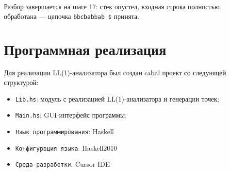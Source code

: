 \documentclass[areasetadvanced]{scrartcl}
\begin{document}
Разбор завершается на шаге 17: стек опустел, входная
строка полностью обработана — цепочка \texttt{bbcbabbab \$} принята.
\newpage
\section{Программная реализация}
Для реализации LL(1)-анализатора был создан cabal проект со следующей структурой:
\begin{itemize}
  \item \texttt{Lib.hs}: модуль с реализацией LL(1)-анализатора и генерации точек;
  \item \texttt{Main.hs}: GUI-интерфейс программы;
  \item \texttt{Язык программирования}: Haskell
  \item \texttt{Конфигурация языка}: Haskell2010
  \item \texttt{Среда разработки}: Cursor IDE
\end{itemize}
\end{document}

